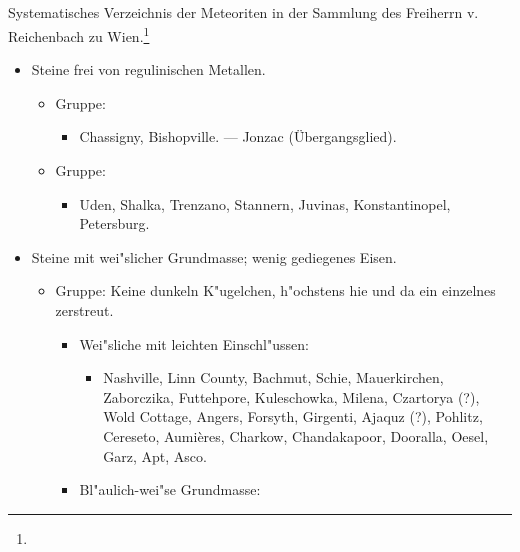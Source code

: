 \documentclass[a4paper, 11pt, oneside]{article}
\begin{document}
\subsection*{}
\begin{center}
Systematisches Verzeichnis der Meteoriten in der Sammlung des Freiherrn v. Reichenbach zu Wien.\footnote{}
\end{center}
\begin{itemize}
    \item[1. Sippe.] Steine frei von regulinischen Metallen.
    \begin{itemize}
        \item[1.] Gruppe:
        \begin{itemize}
            \item Chassigny, Bishopville. --- Jonzac (Übergangsglied).
        \end{itemize}
        \item[2.] Gruppe:
        \begin{itemize}
            \item Uden, Shalka, Trenzano, Stannern, Juvinas, Konstantinopel, Petersburg.
        \end{itemize}
    \end{itemize}
    \item[2. Sippe.] Steine mit wei"slicher Grundmasse; wenig gediegenes Eisen.
    \begin{itemize}
        \item[1.] Gruppe: Keine dunkeln K"ugelchen, h"ochstens hie und da ein einzelnes zerstreut.
        \begin{itemize}
            \item[a.] Wei"sliche mit leichten Einschl"ussen:
            \begin{itemize}
                \item Nashville, Linn County, Bachmut, Schie, Mauerkirchen, Zaborczika, Futtehpore, Kuleschowka, Milena, Czartorya (?), Wold Cottage, Angers, Forsyth, Girgenti, Ajaquz (?), Pohlitz, Cereseto, Aumières, Charkow, Chandakapoor, Dooralla, Oesel, Garz, Apt, Asco.
            \end{itemize}
            \item[b.] Bl"aulich-wei"se Grundmasse:
            \begin{itemize}

\end{itemize}
\end{itemize}
\end{itemize}
\end{itemize}
\end{document}
